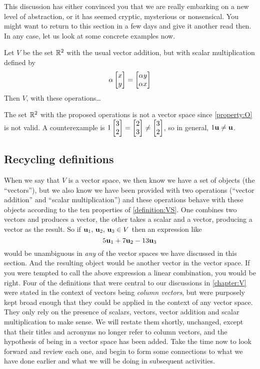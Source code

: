 \documentclass{ximera}
\begin{document}
This discussion has either convinced you that we are really embarking
on a new level of abstraction, or it has seemed cryptic, mysterious or
nonsensical.  You might want to return to this section in a few days
and give it another read then.  In any case, let us look at some
concrete examples now.

\begin{exercise}
  Let $V$ be the set $\mathbb{R}^{2}$ with the usual vector addition, but
  with scalar multiplication defined by
  \[
    \alpha \begin{bmatrix}x\\y\end{bmatrix} = \begin{bmatrix}\alpha y \\ \alpha x\end{bmatrix}
  \]
  Then $V$, with these operations\ldots
  \begin{multipleChoice}
  \end{multipleChoice}

  \begin{feedback}[correct]
    The set $\mathbb{R}^{2}$ with the proposed operations is not a vector
    space since \ref{property:O} is not valid.  A counterexample is
    $1\begin{bmatrix}3\\2 \end{bmatrix} = \begin{bmatrix}2\\3\end{bmatrix}\ne\begin{bmatrix}3\\2 \end{bmatrix}$, so in
    general, $1\mathbf{u}\ne\mathbf{u}$.
  \end{feedback}
\end{exercise}

\subsection{Recycling definitions}

When we say that $V$ is a vector space, we then know we have a set of
objects (the ``vectors''), but we also know we have been provided with
two operations (``vector addition'' and ``scalar multiplication'') and
these operations behave with these objects according to the ten
properties of \ref{definition:VS}.  One combines two vectors and
produces a vector, the other takes a scalar and a vector, producing a
vector as the result.  So if
$\mathbf{u}_1,\,\mathbf{u}_2,\,\mathbf{u}_3\in V$ then an expression like
\[
  5\mathbf{u}_1+7\mathbf{u}_2-13\mathbf{u}_3
\]
would be unambiguous in \textit{any} of the vector spaces we have
discussed in this section.  And the resulting object would be another
vector in the vector space.  If you were tempted to call the above
expression a linear combination, you would be right.  Four of the
definitions that were central to our discussions in \ref{chapter:V}
were stated in the context of vectors being \textit{column vectors},
but were purposely kept broad enough that they could be applied in the
context of any vector space.  They only rely on the presence of
scalars, vectors, vector addition and scalar multiplication to make
sense.  We will restate them shortly, unchanged, except that their
titles and acronyms no longer refer to column vectors, and the
hypothesis of being in a vector space has been added.  Take the time
now to look forward and review each one, and begin to form some
connections to what we have done earlier and what we will be doing in
subsequent activities.
\end{document}
